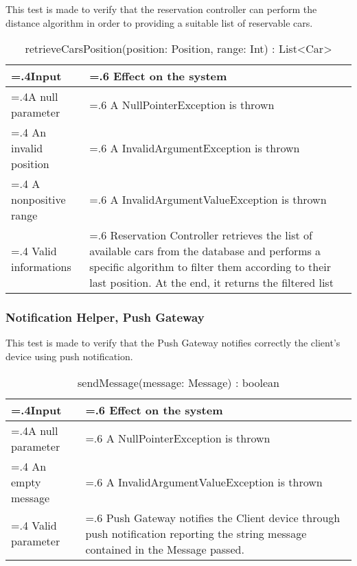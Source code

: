 \documentclass[10pt, a4paper,titlepage]{article}
\begin{document}
\linebreak
This test is made to verify that the reservation controller can perform the distance algorithm in order to providing a suitable list of reservable cars.
\begin{table}[h]
\caption{retrieveCarsPosition(position: Position, range: Int) : List<Car>}
\begin{tabularx}{\textwidth}{|>{\hsize=.4\hsize}X|>{\hsize=.6\hsize}X|}
\hline
Input & Effect on the system\\
\hline
A null parameter & A NullPointerException is thrown\\ 
\hline
An invalid position & A InvalidArgumentException is thrown\\
\hline
A nonpositive range & A InvalidArgumentValueException is thrown\\
\hline
Valid informations & Reservation Controller retrieves the list of available cars from the database and performs a specific algorithm to filter them according to their last position. At the end, it returns the filtered list\\
\hline
\end{tabularx}
\end{table}
\linebreak
\subsubsection{Notification Helper, Push Gateway} \label{sssec3.2.5}
This test is made to verify that the Push Gateway notifies correctly the client’s device using push notification.
\begin{table}[h]
\caption{sendMessage(message: Message) : boolean}
\begin{tabularx}{\textwidth}{|>{\hsize=.4\hsize}X|>{\hsize=.6\hsize}X|}
\hline
Input & Effect on the system\\
\hline
A null parameter & A NullPointerException is thrown\\ 
\hline
An empty message & A InvalidArgumentValueException is thrown\\
\hline
Valid parameter & Push Gateway notifies the Client device through push notification reporting the string message contained in the Message passed.\\
\hline
\end{tabularx}
\end{table}
\linebreak
\end{document}
